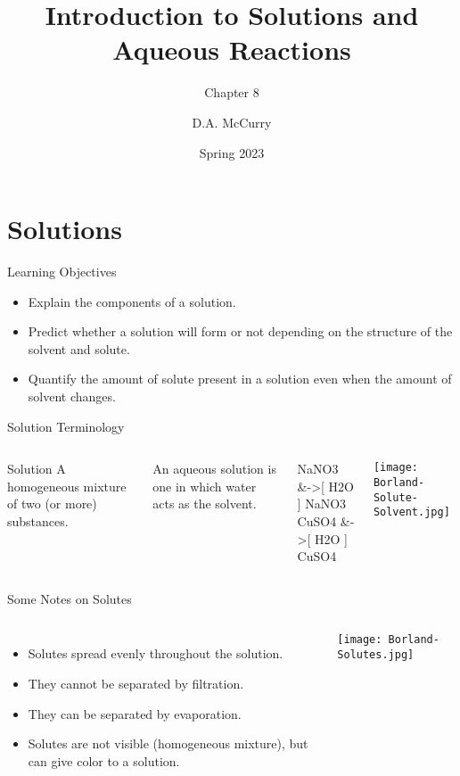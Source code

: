 \documentclass[notes=only]{beamer}
\title{Introduction to Solutions and Aqueous Reactions}
\subtitle{Chapter 8}
\institute{CHEM115 --- Chemistry for the Sciences I \\ Bloomsburg University}
\author{D.A. McCurry}
\date{Spring 2023}
\begin{document}
\maketitle

\section{Solutions}

\begin{frame}{Learning Objectives}
	\begin{itemize}
	\item Explain the components of a solution.
	\item Predict whether a solution will form or not depending on the
		structure of the solvent and solute.
	\item Quantify the amount of solute present in a solution even when the
		amount of solvent changes.
	\end{itemize}
\end{frame}

\begin{frame}{Solution Terminology}
	\begin{columns}
		\begin{block}{Solution}
			A homogeneous mixture of two (or more) substances.
		\end{block}

		\bigskip

		An \alert{aqueous solution} is one in which water acts as the
		solvent.
		\begin{reactions*}
			NaNO3\sld{} &->[ H2O ] NaNO3\aq{} \\
			CuSO4\sld{} &->[ H2O ] CuSO4\aq{}
		\end{reactions*}
		\begin{center}
			\texttt{[image: Borland-Solute-Solvent.jpg]}
		\end{center}
	\end{columns}


%
\end{frame}

\begin{frame}{Some Notes on Solutes}
	\begin{columns}
		\column{0.45\textwidth}
		\begin{itemize}
			\item Solutes spread \alert{evenly} throughout the
				solution.
			\item They cannot be separated by filtration.
			\item They \alert{can} be separated by evaporation.
			\item Solutes are not visible (homogeneous mixture), but
				can give color to a solution.
		\end{itemize}
		\column{0.45\textwidth}
		\begin{center}
			\texttt{[image: Borland-Solutes.jpg]}
		\end{center}
	\end{columns}
\end{frame}
\end{document}
